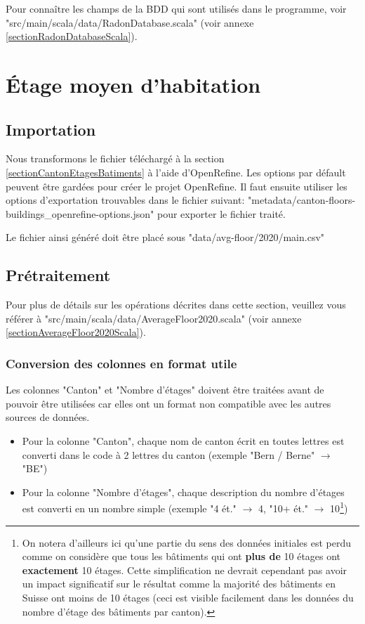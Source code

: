 Pour connaître les champs de la BDD qui sont utilisés dans le programme, voir "src/main/scala/data/RadonDatabase.scala" (voir annexe \ref{sectionRadonDatabaseScala}). 

\section{Étage moyen d'habitation}

\subsection{Importation}
Nous transformons le fichier téléchargé à la section \ref{sectionCantonEtagesBatiments} à l'aide d'OpenRefine. Les options par défault peuvent être gardées pour créer le projet OpenRefine. Il faut ensuite utiliser les options d'exportation trouvables dans le fichier suivant: "metadata/canton-floors-buildings\_openrefine-options.json" pour exporter le fichier traité.

Le fichier ainsi généré doit être placé sous "data/avg-floor/2020/main.csv"

\subsection{Prétraitement}

Pour plus de détails sur les opérations décrites dans cette section, veuillez vous référer à "src/main/scala/data/AverageFloor2020.scala" (voir annexe \ref{sectionAverageFloor2020Scala}). 
\subsubsection{Conversion des colonnes en format utile}
Les colonnes "Canton" et "Nombre d'étages" doivent être traitées avant de pouvoir être utilisées car elles ont un format non compatible avec les autres sources de données. 
\begin{itemize}
\item Pour la colonne "Canton", chaque nom de canton écrit en toutes lettres est converti dans le code à 2 lettres du canton (exemple "Bern / Berne" $\rightarrow$ "BE")
\item Pour la colonne "Nombre d'étages", chaque description du nombre d'étages est converti en un nombre simple (exemple "4 ét." $\rightarrow$ 4, "10+ ét." $\rightarrow$ 10\footnote{On notera d'ailleurs ici qu'une partie du sens des données initiales est perdu comme on considère que tous les bâtiments qui ont \textbf{plus de} 10 étages ont \textbf{exactement} 10 étages. Cette simplification ne devrait cependant pas avoir un impact significatif sur le résultat comme la majorité des bâtiments en Suisse ont moins de 10 étages (ceci est visible facilement dans les données du nombre d'étage des bâtiments par canton).})
\end{itemize}


